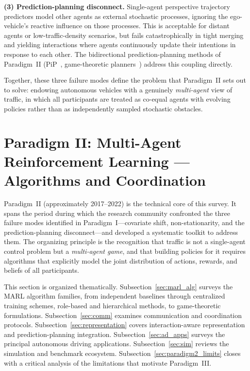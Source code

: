 \documentclass[12pt, a4paper]{article}
\begin{document}
\textbf{(3) Prediction-planning disconnect.}
Single-agent perspective trajectory predictors model other agents as
external stochastic processes, ignoring the ego-vehicle's reactive
influence on those processes.  This is acceptable for distant agents
or low-traffic-density scenarios, but fails catastrophically in
tight merging and yielding interactions where agents continuously
update their intentions in response to each other.  The bidirectional
prediction-planning methods of Paradigm~II (PiP~\cite{song2020pip},
game-theoretic planners~\cite{sadigh2016planning,fisac2019hierarchical})
address this coupling directly.

Together, these three failure modes define the problem that Paradigm~II
sets out to solve: endowing autonomous vehicles with a genuinely
\emph{multi-agent} view of traffic, in which all participants are treated
as co-equal agents with evolving policies rather than as independently
sampled stochastic obstacles.

\section{Paradigm II: Multi-Agent Reinforcement Learning --- Algorithms and Coordination}
\label{sec:paradigm2}

Paradigm~II (approximately 2017--2022) is the technical core of this survey.
It spans the period during which the research community confronted the three
failure modes identified in Paradigm~I---covariate shift, non-stationarity,
and the prediction-planning disconnect---and developed a systematic toolkit
to address them.  The organizing principle is the recognition that traffic is
not a single-agent control problem but a \emph{multi-agent game}, and that
building policies for it requires algorithms that explicitly model the joint
distribution of actions, rewards, and beliefs of all participants.

This section is organized thematically.  Subsection~\ref{sec:marl_alg} surveys
the MARL algorithm families, from independent baselines through centralized
training schemes, role-based and hierarchical methods, to game-theoretic
formulations.  Subsection~\ref{sec:comm} examines communication and coordination
protocols.  Subsection~\ref{sec:representation} covers interaction-aware
representation and prediction-planning integration.
Subsection~\ref{sec:ad_apps} surveys the principal autonomous driving
applications.  Subsection~\ref{sec:sim} reviews the simulation and benchmark
ecosystem.  Subsection~\ref{sec:paradigm2_limits} closes with a critical
analysis of the limitations that motivate Paradigm~III.
\end{document}
